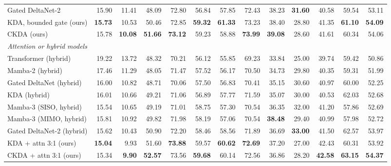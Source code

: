 \begin{table}[t]
\begin{tabular}{lrrrrrrrrrrrr}
    Gated DeltaNet-2 & 15.90 & 11.41 & 48.09 & 72.80 & 56.84 & 57.85 & 72.43 & 38.23 & \textbf{31.60} & 40.58 & 59.54 & 53.11 \\
    KDA, bounded gate (ours) & \textbf{15.73} & 10.53 & 50.46 & 72.85 & \textbf{59.32} & \textbf{61.33} & 73.23 & 38.40 & 28.80 & 41.35 & \textbf{61.10} & \textbf{54.09} \\
    CKDA (ours) & 15.78 & \textbf{10.08} & \textbf{51.66} & \textbf{73.12} & 59.23 & 58.88 & \textbf{73.99} & \textbf{39.08} & 28.60 & 41.61 & 60.34 & 54.06 \\
    \midrule
    \multicolumn{13}{l}{\textit{Attention or hybrid models}} \\
    Transformer (hybrid) & 19.22 & 13.72 & 48.32 & 70.21 & 56.12 & 55.85 & 69.23 & 33.84 & 25.00 & 39.74 & 59.42 & 50.86 \\
    Mamba-2 (hybrid) & 17.46 & 11.29 & 48.05 & 71.47 & 57.52 & 56.17 & 70.50 & 34.73 & 29.80 & 40.35 & 59.31 & 51.99 \\
    Gated DeltaNet (hybrid) & 16.00 & 10.82 & 48.71 & 70.06 & 57.50 & 56.83 & 70.41 & 35.15 & 30.60 & 40.97 & 60.00 & 52.25 \\
    KDA (hybrid) & 16.01 & 10.66 & 49.21 & 71.06 & 56.89 & 57.77 & 71.59 & 35.07 & 30.00 & 40.53 & 62.03 & 52.68 \\
    Mamba-3 (SISO, hybrid) & 15.54 & 10.65 & 49.19 & 71.01 & 58.75 & 57.30 & 70.54 & 36.35 & 32.00 & 41.20 & 57.86 & 52.69 \\
    Mamba-3 (MIMO, hybrid) & 15.81 & 10.92 & 49.82 & 71.98 & 58.19 & 57.06 & 70.54 & \textbf{38.48} & 29.40 & 40.99 & 57.98 & 52.72 \\
    Gated DeltaNet-2 (hybrid) & 15.62 & 10.43 & 50.90 & 72.20 & 58.46 & 58.56 & 71.89 & 36.69 & \textbf{33.00} & 41.50 & 62.57 & 53.97 \\
    KDA + attn 3:1 (ours) & \textbf{15.04} & 9.93 & 51.60 & \textbf{73.88} & 59.57 & \textbf{60.62} & \textbf{72.69} & 37.20 & 27.00 & 42.43 & 60.31 & 53.92 \\
    CKDA + attn 3:1 (ours) & 15.34 & \textbf{9.90} & \textbf{52.57} & 73.56 & \textbf{59.68} & 60.14 & 72.56 & 36.86 & 28.20 & \textbf{42.58} & \textbf{63.15} & \textbf{54.37} \\
    \bottomrule
  \end{tabular}
\end{table}
%
